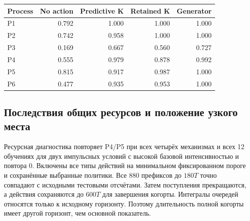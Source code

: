\begin{center}\small\begin{tabular}{lrrrr}\toprule

Process & No action & Predictive K & Retained K & Generator\\\midrule

P1 & 0.792 & 1.000 & 1.000 & 1.000\\

P2 & 0.742 & 0.958 & 1.000 & 1.000\\

P3 & 0.169 & 0.667 & 0.560 & 0.727\\

P4 & 0.555 & 0.979 & 0.878 & 0.992\\

P5 & 0.815 & 0.917 & 0.987 & 1.000\\

P6 & 0.477 & 0.935 & 0.953 & 1.000\\

\bottomrule\end{tabular}\end{center}

\subsection{Последствия общих ресурсов и положение узкого места}

Ресурсная диагностика повторяет P4/P5 при всех четырёх механизмах и всех 12 обучениях для двух импульсных условий с высокой базовой интенсивностью и повтора 0. Включены все типы действий на минимальном фиксированном пороге и сохранённые выбранные политики. Все 880 префиксов до $180T$ точно совпадают с исходными тестовыми отсчётами. Затем поступления прекращаются, а действия сохраняются до $600T$ для завершения когорты. Интегралы очередей относятся только к исходному горизонту. Поэтому длительность полной когорты имеет другой горизонт, чем основной показатель.

